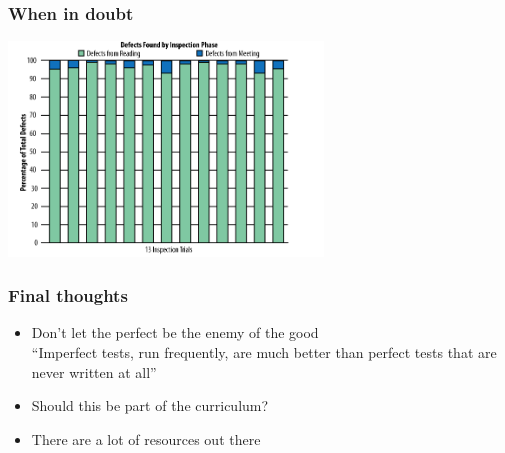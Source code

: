 \documentclass{beamer}
\begin{document}
\begin{frame}
\frametitle{When in doubt}
\includegraphics[height=5.7cm]{figures/review_meetings.png}
\end{frame}

\begin{frame}
\frametitle{Final thoughts}
\begin{itemize}
\pause
\item
Don't let the perfect be the enemy of the good
\\
``Imperfect tests, run frequently, are much better than perfect tests that are
never written at all''\footnotemark[1]
\pause
\item
Should this be part of the curriculum?
\pause
\item
There are a lot of resources out there
\end{itemize}
\end{frame}
\end{document}
